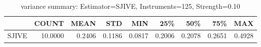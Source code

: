 \begin{table}[ht]
\centering
\caption{variance summary: Estimator=SJIVE, Instruments=125, Strength=0.10}
\begin{tabular}{lrrrrrrrr}
\toprule
 & COUNT & MEAN & STD & MIN & 25\% & 50\% & 75\% & MAX \\
\midrule
SJIVE & 10.0000 & 0.2406 & 0.1186 & 0.0817 & 0.2006 & 0.2078 & 0.2651 & 0.4928 \\
\bottomrule
\end{tabular}
\end{table}
